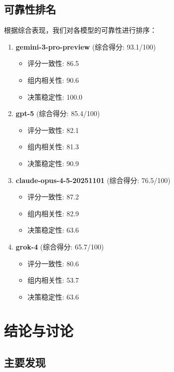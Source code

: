 \documentclass[12pt,a4paper]{article}
\begin{document}
\subsection{可靠性排名}

根据综合表现，我们对各模型的可靠性进行排序：

\begin{enumerate}
\item \textbf{gemini-3-pro-preview} (综合得分: 93.1/100)
\begin{itemize}
    \item 评分一致性: 86.5
    \item 组内相关性: 90.6
    \item 决策稳定性: 100.0
\end{itemize}

\item \textbf{gpt-5} (综合得分: 85.4/100)
\begin{itemize}
    \item 评分一致性: 82.1
    \item 组内相关性: 81.3
    \item 决策稳定性: 90.9
\end{itemize}

\item \textbf{claude-opus-4-5-20251101} (综合得分: 76.5/100)
\begin{itemize}
    \item 评分一致性: 87.2
    \item 组内相关性: 82.9
    \item 决策稳定性: 63.6
\end{itemize}

\item \textbf{grok-4} (综合得分: 65.7/100)
\begin{itemize}
    \item 评分一致性: 80.6
    \item 组内相关性: 53.7
    \item 决策稳定性: 63.6
\end{itemize}

\end{enumerate}

\newpage


\section{结论与讨论}

\subsection{主要发现}
\end{document}
